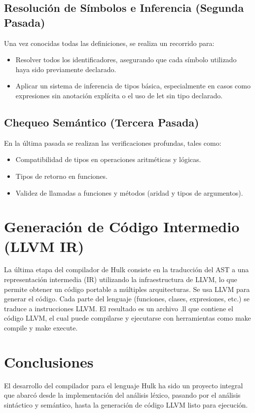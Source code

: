 \documentclass[a4paper,12pt]{article}
\begin{document}
\subsection{Resolución de Símbolos e Inferencia (Segunda Pasada)}
Una vez conocidas todas las definiciones, se realiza un recorrido para:
\begin{itemize}
	\item Resolver todos los identificadores, asegurando que cada símbolo utilizado haya sido previamente declarado.
	\item Aplicar un sistema de inferencia de tipos básica, especialmente en casos como expresiones sin anotación explícita o el uso de let sin tipo declarado.
	
\end{itemize}
\subsection{Chequeo Semántico (Tercera Pasada)}
En la última pasada se realizan las verificaciones profundas, tales como:
\begin{itemize}
	\item Compatibilidad de tipos en operaciones aritméticas y lógicas.
	\item Tipos de retorno en funciones.
	\item Validez de llamadas a funciones y métodos (aridad y tipos de argumentos).
	
\end{itemize}

\section{Generación de Código Intermedio (LLVM IR)}
La última etapa del compilador de Hulk consiste en la traducción del AST a una representación intermedia (IR) utilizando la infraestructura de LLVM, lo que permite obtener un código portable a múltiples arquitecturas.
\newline
\newline
Se usa LLVM para generar el código. Cada parte del lenguaje (funciones, clases, expresiones, etc.) se traduce a instrucciones LLVM.
El resultado es un archivo .ll que contiene el código LLVM, el cual puede compilarse y ejecutarse con herramientas como make compile y make execute.


\section{Conclusiones}
El desarrollo del compilador para el lenguaje Hulk ha sido un proyecto integral que abarcó desde la implementación del análisis léxico, pasando por el análisis sintáctico y semántico, hasta la generación de código LLVM listo para ejecución.
\end{document}
